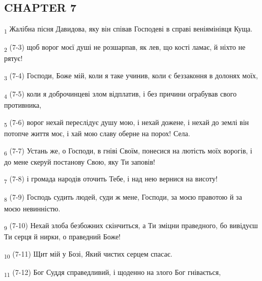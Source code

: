 \subsection{CHAPTER 7}
\begin{tcolorbox}
\textsubscript{1} Жалібна пісня Давидова, яку він співав Господеві в справі веніямінівця Куща.
\end{tcolorbox}
\begin{tcolorbox}
\textsubscript{2} (7-3) щоб ворог моєї душі не розшарпав, як лев, що кості ламає, й ніхто не рятує!
\end{tcolorbox}
\begin{tcolorbox}
\textsubscript{3} (7-4) Господи, Боже мій, коли я таке учинив, коли є беззаконня в долонях моїх,
\end{tcolorbox}
\begin{tcolorbox}
\textsubscript{4} (7-5) коли я доброчинцеві злом відплатив, і без причини ограбував свого противника,
\end{tcolorbox}
\begin{tcolorbox}
\textsubscript{5} (7-6) ворог нехай переслідує душу мою, і нехай дожене, і нехай до землі він потопче життя моє, і хай мою славу оберне на порох! Села.
\end{tcolorbox}
\begin{tcolorbox}
\textsubscript{6} (7-7) Устань же, о Господи, в гніві Своїм, понесися на лютість моїх ворогів, і до мене скеруй постанову Свою, яку Ти заповів!
\end{tcolorbox}
\begin{tcolorbox}
\textsubscript{7} (7-8) і громада народів оточить Тебе, і над нею вернися на висоту!
\end{tcolorbox}
\begin{tcolorbox}
\textsubscript{8} (7-9) Господь судить людей, суди ж мене, Господи, за моєю правотою й за моєю невинністю.
\end{tcolorbox}
\begin{tcolorbox}
\textsubscript{9} (7-10) Нехай злоба безбожних скінчиться, а Ти зміцни праведного, бо вивідуєш Ти серця й нирки, о праведний Боже!
\end{tcolorbox}
\begin{tcolorbox}
\textsubscript{10} (7-11) Щит мій у Бозі, Який чистих серцем спасає.
\end{tcolorbox}
\begin{tcolorbox}
\textsubscript{11} (7-12) Бог Суддя справедливий, і щоденно на злого Бог гнівається,
\end{tcolorbox}
